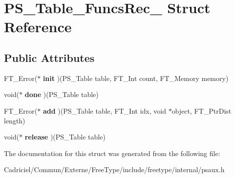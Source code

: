 \hypertarget{struct_p_s___table___funcs_rec__}{}\section{P\+S\+\_\+\+Table\+\_\+\+Funcs\+Rec\+\_\+ Struct Reference}
\label{struct_p_s___table___funcs_rec__}
\subsection*{Public Attributes}
\begin{DoxyCompactItemize}
\item 
F\+T\+\_\+\+Error($\ast$ {\bfseries init} )(P\+S\+\_\+\+Table table, F\+T\+\_\+\+Int count, F\+T\+\_\+\+Memory memory)\hypertarget{struct_p_s___table___funcs_rec___a5ac6b9ff3cb3bec352235cecea5c6def}{}\label{struct_p_s___table___funcs_rec___a5ac6b9ff3cb3bec352235cecea5c6def}

\item 
void($\ast$ {\bfseries done} )(P\+S\+\_\+\+Table table)\hypertarget{struct_p_s___table___funcs_rec___ae358c8c8f5ae26f58c136993ddac6276}{}\label{struct_p_s___table___funcs_rec___ae358c8c8f5ae26f58c136993ddac6276}

\item 
F\+T\+\_\+\+Error($\ast$ {\bfseries add} )(P\+S\+\_\+\+Table table, F\+T\+\_\+\+Int idx, void $\ast$object, F\+T\+\_\+\+Ptr\+Dist length)\hypertarget{struct_p_s___table___funcs_rec___a007697f5aebe1dc71b2a3e01d152a9b5}{}\label{struct_p_s___table___funcs_rec___a007697f5aebe1dc71b2a3e01d152a9b5}

\item 
void($\ast$ {\bfseries release} )(P\+S\+\_\+\+Table table)\hypertarget{struct_p_s___table___funcs_rec___aa593cc617f0caf908d7d7f3dd770fab5}{}\label{struct_p_s___table___funcs_rec___aa593cc617f0caf908d7d7f3dd770fab5}

\end{DoxyCompactItemize}


The documentation for this struct was generated from the following file\+:\begin{DoxyCompactItemize}
\item 
Cadriciel/\+Commun/\+Externe/\+Free\+Type/include/freetype/internal/psaux.\+h\end{DoxyCompactItemize}
